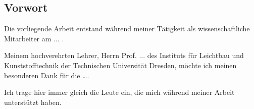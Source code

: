 \hypersetup{pageanchor=false}
\thispagestyle{empty}
\cleardoublepage

\thispagestyle{empty}

\vspace*{\fill}\vspace*{\fill}\vspace*{\fill}\vspace*{\fill}\vspace*{\fill}

\subsection*{Vorwort}

Die vorliegende Arbeit entstand während meiner Tätigkeit als wissenschaftliche Mitarbeiter am ... .

Meinem hochverehrten Lehrer, Herrn Prof. ... des Instituts für Leichtbau und Kunststofftechnik der Technischen Universität Dresden, möchte ich meinen besonderen Dank für die \dots.

Ich trage hier immer gleich die Leute ein, die mich während meiner Arbeit unterstützt haben. 

\cleardoublepage
\hypersetup{pageanchor=true}